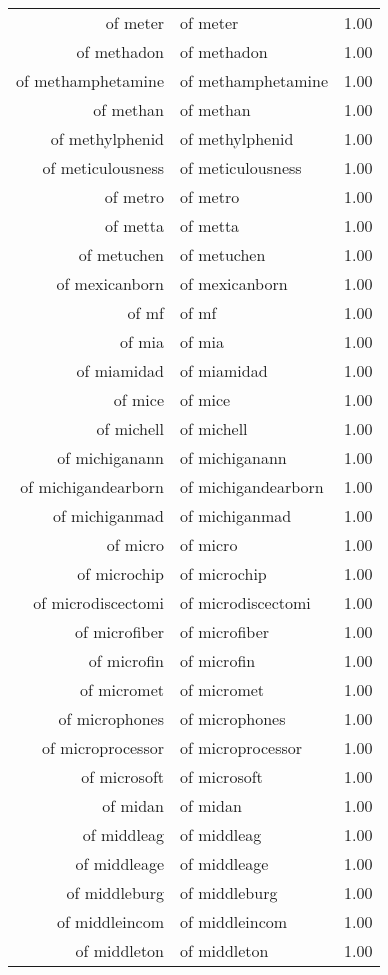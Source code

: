 \begin{table}[ht]
\begin{tabular}{rlr}
  of meter & of meter & 1.00 \\ 
  of methadon & of methadon & 1.00 \\ 
  of methamphetamine & of methamphetamine & 1.00 \\ 
  of methan & of methan & 1.00 \\ 
  of methylphenid & of methylphenid & 1.00 \\ 
  of meticulousness & of meticulousness & 1.00 \\ 
  of metro & of metro & 1.00 \\ 
  of metta & of metta & 1.00 \\ 
  of metuchen & of metuchen & 1.00 \\ 
  of mexicanborn & of mexicanborn & 1.00 \\ 
  of mf & of mf & 1.00 \\ 
  of mia & of mia & 1.00 \\ 
  of miamidad & of miamidad & 1.00 \\ 
  of mice & of mice & 1.00 \\ 
  of michell & of michell & 1.00 \\ 
  of michiganann & of michiganann & 1.00 \\ 
  of michigandearborn & of michigandearborn & 1.00 \\ 
  of michiganmad & of michiganmad & 1.00 \\ 
  of micro & of micro & 1.00 \\ 
  of microchip & of microchip & 1.00 \\ 
  of microdiscectomi & of microdiscectomi & 1.00 \\ 
  of microfiber & of microfiber & 1.00 \\ 
  of microfin & of microfin & 1.00 \\ 
  of micromet & of micromet & 1.00 \\ 
  of microphones & of microphones & 1.00 \\ 
  of microprocessor & of microprocessor & 1.00 \\ 
  of microsoft & of microsoft & 1.00 \\ 
  of midan & of midan & 1.00 \\ 
  of middleag & of middleag & 1.00 \\ 
  of middleage & of middleage & 1.00 \\ 
  of middleburg & of middleburg & 1.00 \\ 
  of middleincom & of middleincom & 1.00 \\ 
  of middleton & of middleton & 1.00 \\ 

\end{tabular}
\end{table}
